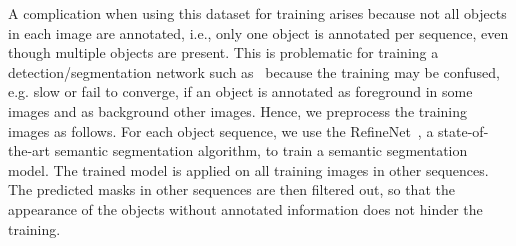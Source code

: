 \documentclass[conference]{IEEEtran}
\begin{document}
A complication when using this dataset for training arises because  
not all objects in each image are annotated, i.e., only one object is annotated per sequence, even though multiple objects are present. This is problematic for training a detection/segmentation network such as~\cite{Faster-RCNN,Mask-RCNN} because the training may be confused, e.g. slow or fail to converge, if an object is annotated as foreground in some images and as background other images. 
Hence, we preprocess the training images as follows. For each object sequence, we use the RefineNet~\cite{Lin:2017:RefineNet}, a state-of-the-art semantic segmentation algorithm, to train a semantic segmentation model. The trained model is applied on all training images in other sequences. The predicted masks in other sequences are then filtered out, so that the appearance of the objects without annotated information does not hinder the training. 
\end{document}
